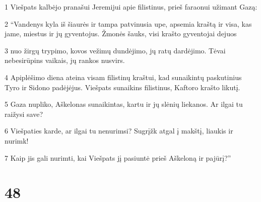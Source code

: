 \par 1 Viešpats kalbėjo pranašui Jeremijui apie filistinus, prieš faraonui užimant Gazą: 
\par 2 “Vandenys kyla iš šiaurės ir tampa patvinusia upe, apsemia kraštą ir visa, kas jame, miestus ir jų gyventojus. Žmonės šauks, visi krašto gyventojai dejuos 
\par 3 nuo žirgų trypimo, kovos vežimų dundėjimo, jų ratų dardėjimo. Tėvai nebesirūpins vaikais, jų rankos nusvirs. 
\par 4 Apiplėšimo diena ateina visam filistinų kraštui, kad sunaikintų paskutinius Tyro ir Sidono padėjėjus. Viešpats sunaikins filistinus, Kaftoro krašto likutį. 
\par 5 Gaza nupliko, Aškelonas sunaikintas, kartu ir jų slėnių liekanos. Ar ilgai tu raižysi save? 
\par 6 Viešpaties karde, ar ilgai tu nenurimsi? Sugrįžk atgal į makštį, liaukis ir nurimk! 
\par 7 Kaip jis gali nurimti, kai Viešpats jį pasiuntė prieš Aškeloną ir pajūrį?”



\chapter{48}


